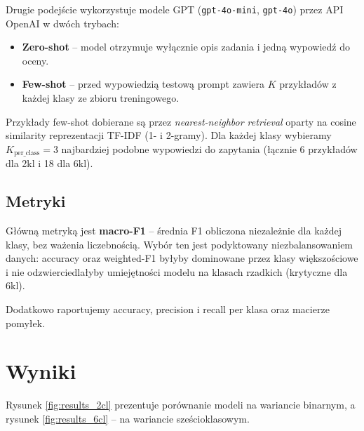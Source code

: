 \documentclass[11pt,a4paper]{article}
\begin{document}
Drugie podejście wykorzystuje modele GPT (\texttt{gpt-4o-mini}, \texttt{gpt-4o})
przez API OpenAI w dwóch trybach:
\begin{itemize}
  \item \textbf{Zero-shot} -- model otrzymuje wyłącznie opis zadania i jedną
        wypowiedź do oceny.
  \item \textbf{Few-shot} -- przed wypowiedzią testową prompt zawiera $K$
        przykładów z każdej klasy ze zbioru treningowego.
\end{itemize}

Przykłady few-shot dobierane są przez \emph{nearest-neighbor retrieval} oparty
na cosine similarity reprezentacji TF-IDF (1- i 2-gramy). Dla każdej klasy
wybieramy $K_{\text{per\_class}}=3$ najbardziej podobne wypowiedzi do
zapytania (łącznie 6 przykładów dla 2kl i 18 dla 6kl).

\subsection{Metryki}

Główną metryką jest \textbf{macro-F1} -- średnia F1 obliczona niezależnie dla
każdej klasy, bez ważenia liczebnością. Wybór ten jest podyktowany
niezbalansowaniem danych: accuracy oraz weighted-F1 byłyby dominowane przez
klasy większościowe i nie odzwierciedlałyby umiejętności modelu na klasach
rzadkich (krytyczne dla 6kl).

Dodatkowo raportujemy accuracy, precision i recall per klasa oraz macierze
pomyłek.

\section{Wyniki}

Rysunek \ref{fig:results_2cl} prezentuje porównanie modeli na wariancie
binarnym, a rysunek \ref{fig:results_6cl} -- na wariancie sześcioklasowym.
\end{document}
